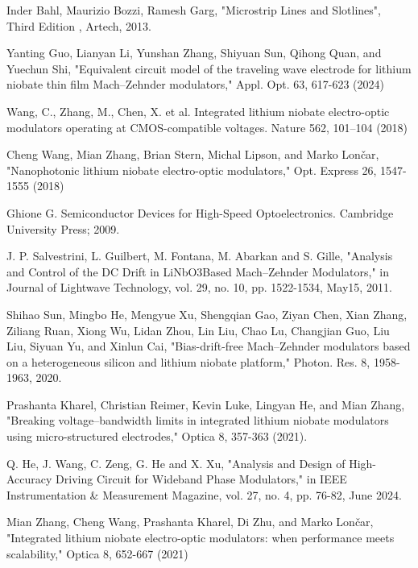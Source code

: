 \documentclass[thesis]{deutez}
\begin{document}
\begin{thebibliography}{30}
         Inder Bahl, Maurizio Bozzi, Ramesh Garg, "Microstrip Lines and Slotlines", Third Edition , Artech, 2013.

         Yanting Guo, Lianyan Li, Yunshan Zhang, Shiyuan Sun, Qihong Quan, and Yuechun Shi, "Equivalent circuit model of the traveling wave electrode for lithium niobate thin film Mach–Zehnder modulators," Appl. Opt. 63, 617-623 (2024)

         Wang, C., Zhang, M., Chen, X. et al. Integrated lithium niobate electro-optic modulators operating at CMOS-compatible voltages. Nature 562, 101–104 (2018)

         Cheng Wang, Mian Zhang, Brian Stern, Michal Lipson, and Marko Lončar, "Nanophotonic lithium niobate electro-optic modulators," Opt. Express 26, 1547-1555 (2018)

         Ghione G. Semiconductor Devices for High-Speed Optoelectronics. Cambridge University Press; 2009.

         J. P. Salvestrini, L. Guilbert, M. Fontana, M. Abarkan and S. Gille, "Analysis and Control of the DC Drift in LiNbO3Based Mach–Zehnder Modulators," in Journal of Lightwave Technology, vol. 29, no. 10, pp. 1522-1534, May15, 2011.

         Shihao Sun, Mingbo He, Mengyue Xu, Shengqian Gao, Ziyan Chen, Xian Zhang, Ziliang Ruan, Xiong Wu, Lidan Zhou, Lin Liu, Chao Lu, Changjian Guo, Liu Liu, Siyuan Yu, and Xinlun Cai, "Bias-drift-free Mach–Zehnder modulators based on a heterogeneous silicon and lithium niobate platform," Photon. Res. 8, 1958-1963, 2020.

         Prashanta Kharel, Christian Reimer, Kevin Luke, Lingyan He, and Mian Zhang, "Breaking voltage–bandwidth limits in integrated lithium niobate modulators using micro-structured electrodes," Optica 8, 357-363 (2021).

         Q. He, J. Wang, C. Zeng, G. He and X. Xu, "Analysis and Design of High-Accuracy Driving Circuit for Wideband Phase Modulators," in IEEE Instrumentation \& Measurement Magazine, vol. 27, no. 4, pp. 76-82, June 2024.

         Mian Zhang, Cheng Wang, Prashanta Kharel, Di Zhu, and Marko Lončar, "Integrated lithium niobate electro-optic modulators: when performance meets scalability," Optica 8, 652-667 (2021) 
	\end{thebibliography}
\end{document}
